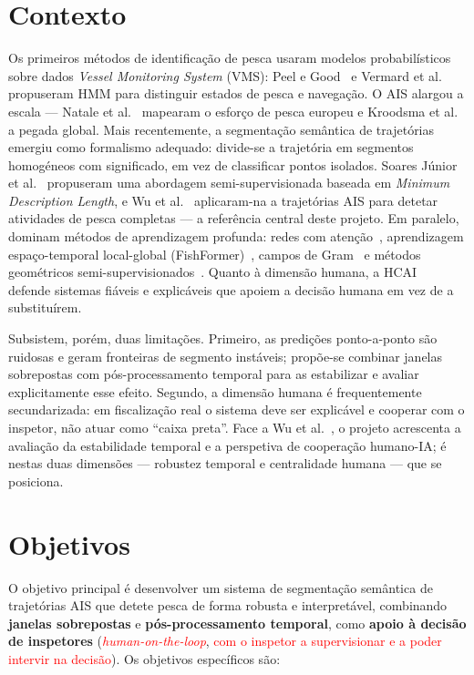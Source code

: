 \documentclass{article}
\begin{document}
\section{Contexto}
\label{sec:contexto}

Os primeiros métodos de identificação de pesca usaram modelos probabilísticos sobre dados \emph{Vessel Monitoring System} (VMS): Peel e Good~ e Vermard et al.~ propuseram HMM para distinguir estados de pesca e navegação. O AIS alargou a escala --- Natale et al.~ mapearam o esforço de pesca europeu e Kroodsma et al.~ a pegada global. Mais recentemente, a segmentação semântica de trajetórias emergiu como formalismo adequado: divide-se a trajetória em segmentos homogéneos com significado, em vez de classificar pontos isolados. Soares Júnior et al.~ propuseram uma abordagem semi-supervisionada baseada em \emph{Minimum Description Length}, e Wu et al.~ aplicaram-na a trajetórias AIS para detetar atividades de pesca completas --- a referência central deste projeto. Em paralelo, dominam métodos de aprendizagem profunda: redes com atenção~\cite{cheng2025}, aprendizagem espaço-temporal local-global (FishFormer)~\cite{wang2026}, campos de Gram~\cite{hu2026} e métodos geométricos semi-supervisionados~\cite{ferreira2022}. Quanto à dimensão humana, a HCAI~\cite{shneiderman2020} defende sistemas fiáveis e explicáveis que apoiem a decisão humana em vez de a substituírem.

Subsistem, porém, duas limitações. Primeiro, as predições ponto-a-ponto são ruidosas e geram fronteiras de segmento instáveis; propõe-se combinar janelas sobrepostas com pós-processamento temporal para as estabilizar e avaliar explicitamente esse efeito. Segundo, a dimensão humana é frequentemente secundarizada: em fiscalização real o sistema deve ser explicável e cooperar com o inspetor, não atuar como ``caixa preta''. Face a Wu et al.~, o projeto acrescenta a avaliação da estabilidade temporal e a perspetiva de cooperação humano-IA; é nestas duas dimensões --- robustez temporal e centralidade humana --- que se posiciona.

\section{Objetivos}
\label{sec:objetivos}

O objetivo principal é desenvolver um sistema de segmentação semântica de trajetórias AIS que detete pesca de forma robusta e interpretável, combinando \textbf{janelas sobrepostas} e \textbf{pós-processamento temporal}, como \textbf{apoio à decisão de inspetores} (\textcolor{red}{\emph{human-on-the-loop}}, \textcolor{red}{com o inspetor a supervisionar e a poder intervir na decisão}). Os objetivos específicos são:
\end{document}
